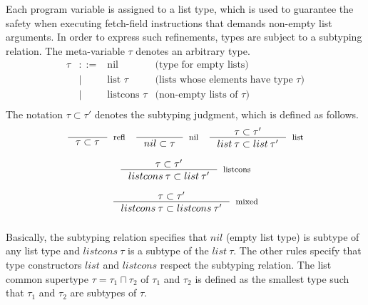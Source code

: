 \documentclass[sigconf]{acmart}
\theoremstyle{definition}
\begin{document}
Each program variable is assigned to a list type, which is used to guarantee the safety when executing
fetch-field instructions that demands non-empty list arguments. In order to express such refinements, types are subject to a
subtyping relation. The meta-variable $\tau$ denotes an arbitrary type. 
\[
\begin{array}{rcll}
  \tau & ::=  & \text{nil} & \text{(type for empty lists)}\\
       & \mid & \text{list }\tau & \text{(lists whose elements have type $\tau$)}\\
       & \mid & \text{listcons }\tau & \text{(non-empty lists of $\tau$)}\\
\end{array}
\]
The notation $\tau \subset \tau'$
denotes the subtyping judgment, which is defined as follows.
\[
\begin{array}{ccc}
  \inference{}
            {\tau\subset \tau}
            [refl]
  &
  \inference{}
            {nil \subset \tau}
            [nil]
  &
  \inference{\tau \subset \tau'}
            {list\:\tau\subset list\:\tau'}
            [list]\\\\
  \multicolumn{3}{c}{
  \inference{\tau \subset \tau'}
            {listcons\:\tau\subset list\:\tau'}
            [listcons]} \\\\
            \multicolumn{3}{c}{
            \inference{\tau \subset \tau'}
            {listcons\:\tau\subset listcons\:\tau'}
            [mixed]} \\\\
\end{array}
\]
Basically, the subtyping relation specifies that $nil$ (empty list type) is
subtype of any list type and $listcons\:\tau$ is a subtype of the $list\:\tau$.
The other rules specify that type constructors $list$ and $listcons$ respect
the subtyping relation. The list common supertype $\tau = \tau_1 \sqcap \tau_2$ of
$\tau_1$ and $\tau_2$ is defined as the smallest type such that $\tau_1$ and $\tau_2$
are subtypes of $\tau$.
\end{document}
